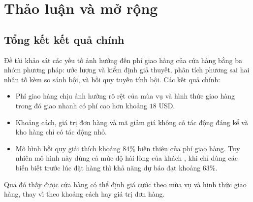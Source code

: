 \section{Thảo luận và mở rộng}

\subsection{Tổng kết kết quả chính}
Đề tài khảo sát các yếu tố ảnh hưởng đến phí giao hàng của cửa hàng bằng ba nhóm phương pháp: ước lượng và kiểm định giả thuyết, phân tích phương sai hai nhân tố kèm so sánh bội, và hồi quy tuyến tính bội. Các kết quả chính:
\begin{itemize}
    \item Phí giao hàng chịu ảnh hưởng rõ rệt của mùa vụ và hình thức giao hàng trong đó giao nhanh có phí cao hơn khoảng $18$ USD.
    \item Khoảng cách, giá trị đơn hàng và mã giảm giá không có tác động đáng kể và kho hàng chỉ có tác động nhỏ.
    \item Mô hình hồi quy giải thích khoảng $84\%$ biến thiên của phí giao hàng. Tuy nhiên mô hình này dùng cả mức độ hài lòng của khách , khi chỉ dùng các biến biết trước lúc đặt hàng thì khả năng dự báo đạt khoảng $63\%$.
\end{itemize}
Qua đó thấy được cửa hàng có thể định giá cước theo mùa vụ và hình thức giao hàng, thay vì theo khoảng cách hay giá trị đơn hàng.

